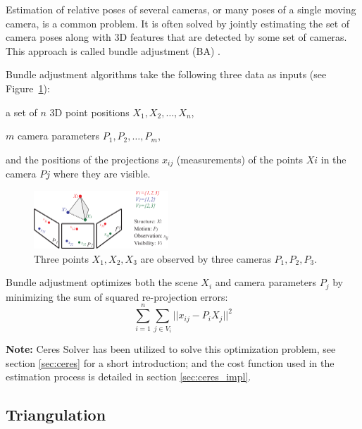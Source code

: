 Estimation of relative poses of several cameras, or many poses of a single moving camera, is a common problem. It is often solved by jointly estimating the set of camera poses along with 3D features that are detected by some set of cameras. This approach is called bundle adjustment (BA) \cite{BA}.

Bundle adjustment algorithms take the following three data as inputs (see Figure~\ref{fig:BA}):
\begin{itemize*}
 \item a set of $n$ 3D point positions $X_1, X_2, \dots, X_n$,
 \item $m$ camera parameters $P_1, P_2, \dots, P_m$,
 \item and the positions of the projections $x_{ij}$ (measurements) of the points $Xi$ in the camera $Pj$ where they are visible.
\end{itemize*}

\begin{figure}[!htbp]
 \centering
 \includegraphics[width=0.45\textwidth]{images/BA.pdf}
 \caption{Three points $X_1, X_2, X_3$ are observed by three cameras $P_1, P_2, P_3$.}
 \label{fig:BA}
\end{figure}

\noindent
Bundle adjustment optimizes both the scene $X_i$ and camera parameters $P_j$ by minimizing the sum of squared re-projection errors:
\begin{equation}
 \sum _{i=1}^{n}\sum _{j\in V_{i}} ||x_{ij}-P_{i}X_{j}||^2
\end{equation}

\noindent
\textbf{Note:} Ceres Solver has been utilized to solve this optimization problem, see section \ref{sec:ceres} for a short introduction; and the cost function used in the estimation process is detailed in section \ref{sec:ceres_impl}.


\subsection{Triangulation}
\label{sec:triangulation}

